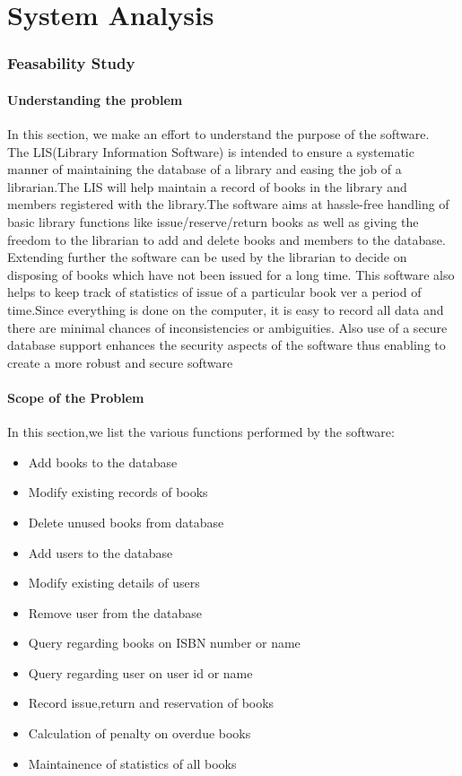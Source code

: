\documentclass{article}
\begin{document}
\part{System Analysis}
\section{Feasability Study}
\subsection{Understanding the problem}
In this section, we make an effort to understand the purpose of the software.
\\
The LIS(Library Information Software) is intended to ensure a systematic manner of maintaining the database of a library and easing the job of a librarian.The LIS will help maintain a record of books in the library and members registered with the library.The software aims at hassle-free handling of basic library functions like issue/reserve/return books as well as giving the freedom to the librarian to add and delete books and members to the database.
	Extending further the software can be used by the librarian to decide on disposing of books which have not been issued for a long time. This software also helps to keep track of statistics of issue of a particular book ver a period of time.Since everything is done on the computer, it is easy to record all data and there are minimal chances of inconsistencies or ambiguities.
Also use of a secure database support enhances the security aspects of the software thus enabling to create a more robust and secure software
\subsection{Scope of the Problem}
In this section,we list the various functions performed by the software:
\begin{itemize}
\item Add books to the database
\item Modify existing records of books
\item Delete unused books from database
\item Add users to the database
\item Modify existing details of users
\item Remove user from the database
\item Query regarding books on ISBN number or name
\item Query regarding user on user id or name
\item Record issue,return and reservation of books
\item Calculation of penalty on overdue books
\item Maintainence of statistics of all books 
\end{itemize}
\end{document}
